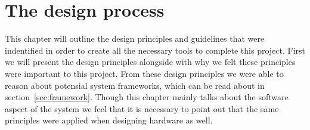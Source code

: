 \chapter{The design process}
	This chapter will outline the design principles and guidelines that were indentified in order to create all the necessary tools to complete this project. 
	First we will present the design principles alongside with why we felt these principles were important to this project.
	From these design principles we were able to reason about potensial system frameworks, which can be read about in section~\ref{sec:framework}.
	Though this chapter mainly talks about the software aspect of the system we feel that it is necessary to point out that the same principles were applied when designing hardware as well.
	


%

